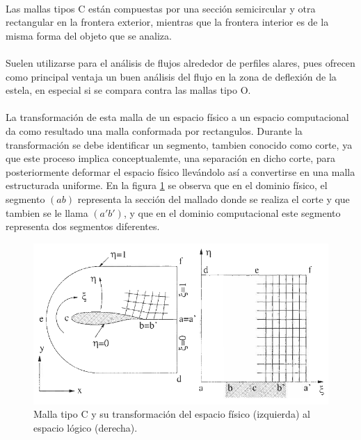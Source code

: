 \documentclass[letterpaper, openright, 12pt]{book}
\begin{document}
			\paragraph*{}
				Las mallas tipos C están compuestas por una sección semicircular y otra rectangular en la frontera exterior, mientras que la frontera interior es de la misma forma del objeto que se analiza.
			\paragraph*{}
				Suelen utilizarse para el análisis de flujos alrededor de perfiles alares, pues ofrecen como principal ventaja un buen análisis del flujo en la zona de deflexión de la estela, en especial si se compara contra las mallas tipo O.\cite{best-practices-grid-generation}
			\paragraph{}
				La transformación de esta malla de un espacio físico a un espacio computacional da como resultado una malla conformada por rectangulos. Durante la transformación se debe identificar un segmento, tambien conocido como corte, ya que este proceso implica conceptualemte, una separación en dicho corte, para posteriormente deformar el espacio físico llevándolo así a convertirse en una malla estructurada uniforme. En la figura \ref{fig:malla-c} se observa que en el dominio físico, el segmento $(ab)$ representa la sección del mallado donde se realiza el corte y que tambien se le llama $(a'b')$, y que en el dominio computacional este segmento representa dos segmentos diferentes.
				\begin{figure}[htbp!]
					\centering
					\includegraphics[width=155mm]{./Imagenes/malla-c}
					\captionsetup{justification=centering, margin=2cm}
					\caption[Malla tipo C]{Malla tipo C y su transformación del espacio físico (izquierda) al espacio lógico (derecha). \cite{blazek}}
					\label{fig:malla-c}
				\end{figure}
\end{document}
